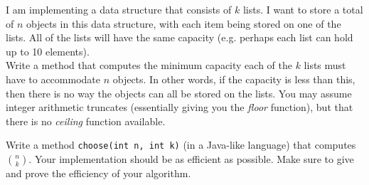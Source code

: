 \begin{pro}
I am implementing a data structure that consists of $k$ lists. 
I want to store a total of $n$ objects in this data structure, with each item being stored on one of the lists.
All of the lists will have the same capacity (e.g. perhaps each list can hold up to 10 elements).\\
Write a method  that computes the minimum capacity
each of the $k$ lists must have to accommodate $n$ objects.
In other words, if the capacity is less than this, then there is no way the objects can all be stored on the lists.
You may assume integer arithmetic truncates (essentially giving you the {\em floor} function), 
but that there is no {\em ceiling} function available.
\end{pro}

\begin{pro}
Write a method \verb+choose(int n, int k)+ (in a Java-like language) that computes $\binom{n}{ k}$.
Your implementation should be as efficient as possible.
Make sure to give and prove the efficiency of your algorithm.
\end{pro}


